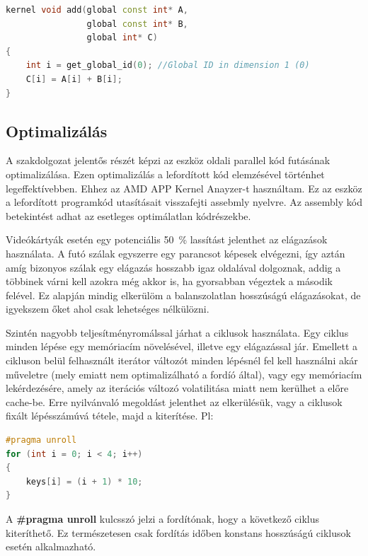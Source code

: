 \begin{lstlisting}[language={C++}]
kernel void add(global const int* A,
                global const int* B,
                global int* C)
{ 
    int i = get_global_id(0); //Global ID in dimension 1 (0)
    C[i] = A[i] + B[i]; 
}
\end{lstlisting}



\subsection{Optimalizálás}

A szakdolgozat jelentős részét képzi az eszköz oldali parallel kód futásának optimalizálása. Ezen optimalizálás a lefordított kód elemzésével történhet legeffektívebben. Ehhez az AMD APP Kernel Anayzer-t használtam. Ez az eszköz a lefordított programkód utasításait visszafejti assebmly nyelvre. Az assembly kód betekintést adhat az esetleges optimálatlan kódrészekbe. 

Videókártyák esetén egy potenciális \SI{50}{\percent} lassítást jelenthet az elágazások használata. A futó szálak egyszerre egy parancsot képesek elvégezni, így aztán amíg bizonyos szálak egy elágazás hosszabb igaz oldalával dolgoznak, addig a többinek várni kell azokra még akkor is, ha gyorsabban végeztek a második felével. Ez alapján mindig elkerülöm a balanszolatlan hosszúságú elágazásokat, de igyekszem őket ahol csak lehetséges nélkülözni.

Szintén nagyobb teljesítményromálssal járhat a ciklusok használata. Egy ciklus minden lépése egy memóriacím növelésével, illetve egy elágazással jár. Emellett a cikluson belül felhasznált iterátor változót minden lépésnél fel kell használni akár műveletre (mely emiatt nem optimalizálható a fordíó által), vagy egy memóriacím lekérdezésére, amely az iterációs változó volatilitása miatt nem kerülhet a előre cache-be. Erre nyilvánvaló megoldást jelenthet az elkerülésük, vagy a ciklusok fixált lépésszámúvá tétele, majd a kiterítése. Pl:


\begin{lstlisting}[language={C++}]
#pragma unroll
for (int i = 0; i < 4; i++)
{
    keys[i] = (i + 1) * 10;
}
\end{lstlisting}


A \textbf{\#pragma unroll} kulcsszó jelzi a fordítónak, hogy a következő ciklus kiteríthető. Ez természetesen csak fordítás időben konstans hosszúságú ciklusok esetén alkalmazható.


